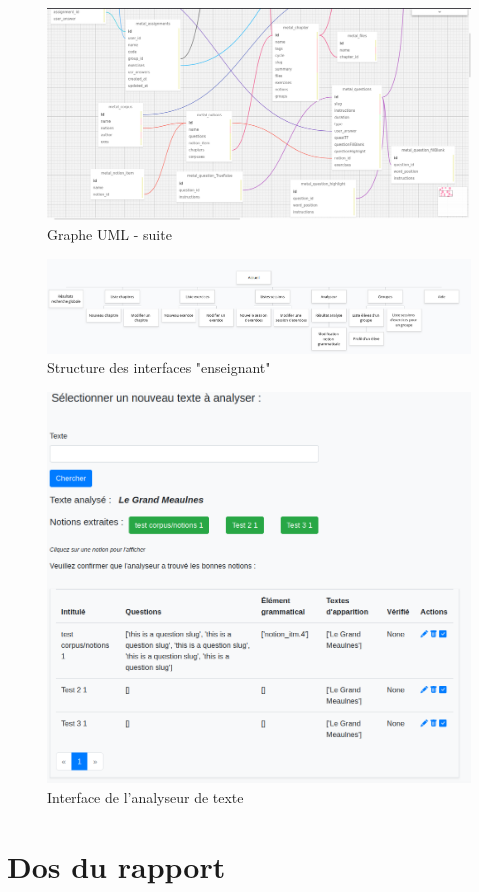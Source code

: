 \documentclass[12pt]{article}
\begin{document}
\begin{figure}
    \centering
    \includegraphics[scale=0.27]{uml2.png}
    \caption{Graphe UML - suite}
    \label{fig:UML2}
\end{figure}


\begin{figure}
    \centering
    \includegraphics[scale=0.33]{arbre_pages_web.png}
    \caption{Structure des interfaces "enseignant"}
    \label{fig:arbre_pages}
\end{figure}

\begin{figure}
    \centering
    \includegraphics[scale=0.5]{analyseur_interface.png}
    \caption{Interface de l'analyseur de texte}
    \label{fig:analyseur}
\end{figure}



\clearpage
\section*{Dos du rapport}
\thispagestyle{empty}

\end{document}
